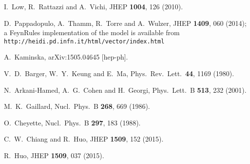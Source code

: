   I.~Low, R.~Rattazzi and A.~Vichi,
  JHEP {\bf 1004}, 126 (2010).

  D.~Pappadopulo, A.~Thamm, R.~Torre and A.~Wulzer,
  JHEP {\bf 1409}, 060 (2014); a FeynRules implementation
  of the model is available from 
  \texttt{http://heidi.pd.infn.it/html/vector/index.html}

  A.~Kaminska,
  arXiv:1505.04645 [hep-ph].

  V.~D.~Barger, W.~Y.~Keung and E.~Ma,
  Phys.\ Rev.\ Lett.\  {\bf 44}, 1169 (1980).

  N.~Arkani-Hamed, A.~G.~Cohen and H.~Georgi,
  Phys.\ Lett.\ B {\bf 513}, 232 (2001).
  
  M.~K.~Gaillard,
  Nucl.\ Phys.\ B {\bf 268}, 669 (1986).

  O.~Cheyette,
  Nucl.\ Phys.\ B {\bf 297}, 183 (1988).

  C.~W.~Chiang and R.~Huo,
  JHEP {\bf 1509}, 152 (2015).  

  R.~Huo,
  JHEP {\bf 1509}, 037 (2015).
  
